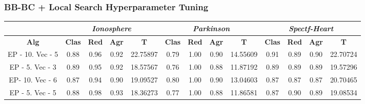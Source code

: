 \documentclass[10pt, a4paper]{article}
\theoremstyle{theorem-style}
\theoremstyle{theorem-style}
\theoremstyle{theorem2-style}
\theoremstyle{definition-style}
\theoremstyle{remark-style}
\theoremstyle{example-style}
\theoremstyle{definition-style}
\theoremstyle{remark-style}
\theoremstyle{remark-style}
\begin{document}
\subsubsection{BB-BC + Local Search Hyperparameter Tuning}
\begin{table}[h]
\begin{tabular}{ccccc|cccc|cccc}
\centering
 & \multicolumn{4}{c}{\textit{Ionosphere}} & \multicolumn{4}{c}{\textit{Parkinson}} & \multicolumn{4}{c}{\textit{Spectf-Heart}} \\ \hline
\textbf{Alg} & \textbf{Clas} & \textbf{Red} & \textbf{Agr} & \textbf{T} & \textbf{Clas} & \textbf{Red} & \textbf{Agr} & \textbf{T} & \textbf{Clas} & \textbf{Red} & \textbf{Agr} & \textbf{T} \\
\hline
EP - 10. Vec - 5 & 0.88 & 0.96 & 0.92 & 22.75897 &	0.79 & 1.00 & 0.90 & 14.55609 &		0.91 & 0.89 & 0.90 & 22.70724\\
EP - 5. Vec - 3 & 0.89 & 0.95 & 0.92 & 18.57567 &	0.76 & 1.00 & 0.88 & 11.87192	&	0.89 & 0.89 & 0.89 & 19.57296 \\
EP- 10. Vec - 6 & 0.87 & 0.94 & 0.90 & 19.09527	&0.80 & 1.00 & 0.90 & 13.04603	&	0.87 & 0.87 & 0.87 & 20.70465\\
EP - 5. Vec - 5 & 0.88 & 0.98 & 0.93 & 18.36273	&0.77 & 1.00 & 0.88 & 11.86581&		0.87 & 0.90 & 0.89 & 19.08534
\end{tabular}
\end{table}
\end{document}
